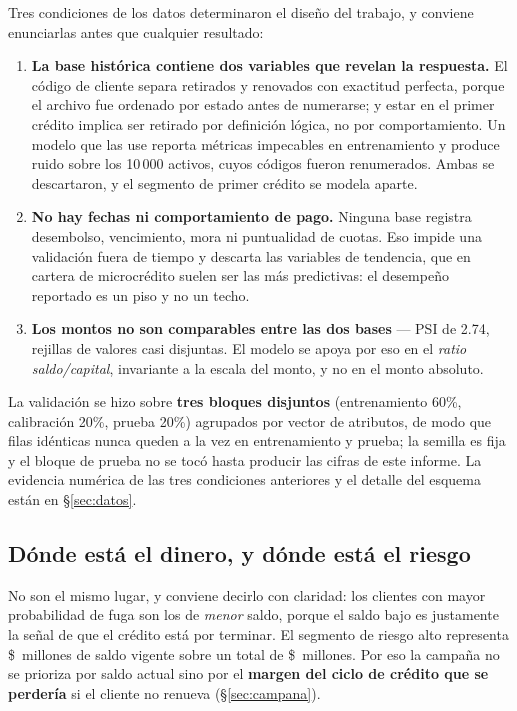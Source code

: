 \documentclass[11pt,a4paper]{article}
\begin{document}
Tres condiciones de los datos determinaron el diseño del trabajo, y conviene
enunciarlas antes que cualquier resultado:

\begin{enumerate}[leftmargin=*]
\item \textbf{La base histórica contiene dos variables que revelan la respuesta.}
      El código de cliente separa retirados y renovados con exactitud perfecta,
      porque el archivo fue ordenado por estado antes de numerarse; y estar en el
      primer crédito implica ser retirado por definición lógica, no por
      comportamiento. Un modelo que las use reporta métricas impecables en
      entrenamiento y produce ruido sobre los 10\,000 activos, cuyos códigos
      fueron renumerados. Ambas se descartaron, y el segmento de primer crédito
      se modela aparte.
\item \textbf{No hay fechas ni comportamiento de pago.} Ninguna base registra
      desembolso, vencimiento, mora ni puntualidad de cuotas. Eso impide una
      validación fuera de tiempo y descarta las variables de tendencia, que en
      cartera de microcrédito suelen ser las más predictivas: el desempeño
      reportado es un piso y no un techo.
\item \textbf{Los montos no son comparables entre las dos bases} --- PSI de 2.74,
      rejillas de valores casi disjuntas. El modelo se apoya por eso en el
      \emph{ratio saldo/capital}, invariante a la escala del monto, y no en el
      monto absoluto.
\end{enumerate}

\noindent La validación se hizo sobre \textbf{tres bloques disjuntos}
(entrenamiento 60\%, calibración 20\%, prueba 20\%) agrupados por vector de
atributos, de modo que filas idénticas nunca queden a la vez en entrenamiento y
prueba; la semilla es fija y el bloque de prueba no se tocó hasta producir las
cifras de este informe. La evidencia numérica de las tres condiciones anteriores
y el detalle del esquema están en \S\ref{sec:datos}.

\subsection*{Dónde está el dinero, y dónde está el riesgo}

No son el mismo lugar, y conviene decirlo con claridad: los clientes con mayor
probabilidad de fuga son los de \emph{menor} saldo, porque el saldo bajo es
justamente la señal de que el crédito está por terminar. El segmento de riesgo
alto representa \$\SaldoAlto~millones de saldo vigente sobre un total de
\$\SaldoTotal~millones. Por eso la campaña no se prioriza por saldo actual sino
por el \textbf{margen del ciclo de crédito que se perdería} si el cliente no
renueva (\S\ref{sec:campana}).
\end{document}

